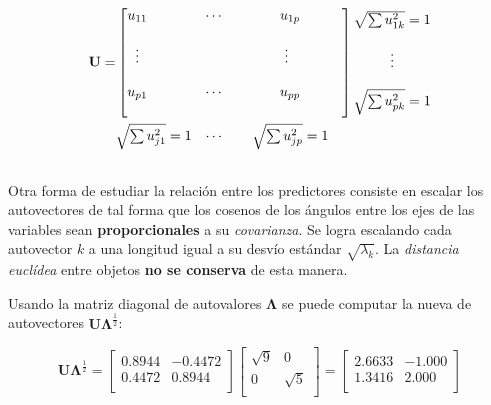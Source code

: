 \documentclass[]{book}
\theoremstyle{definition}
\theoremstyle{definition}
\theoremstyle{definition}
\theoremstyle{remark}
\begin{document}
\[
\begin{aligned}
  \mathbf{U} = 
    &\begin{bmatrix}
      u_{11}\hphantom{0000} & \hphantom{00}\cdots & \hphantom{000000}u_{1p}\hphantom{000000} \\\\
      \vdots\hphantom{0000} & \  & \hphantom{00000}\vdots\hphantom{000000} \\\\
      u_{p1}\hphantom{0000} & \hphantom{00}\cdots & \hphantom{000000}u_{pp}\hphantom{000000} \\
    &\end{bmatrix}
    \begin{matrix}
      \sqrt{\sum u_{1k}^{2}} = 1 \\\\
      \vdots \\\\
      \sqrt{\sum u_{pk}^{2}} = 1 \\
    \end{matrix} \\
    &\begin{matrix}
      \sqrt{\sum u_{j1}^{2}} = 1 & \cdots&& \sqrt{\sum u_{jp}^{2}} = 1 & \\
    &\end{matrix} \\
\end{aligned}
\]

Otra forma de estudiar la relación entre los predictores consiste en
escalar los autovectores de tal forma que los cosenos de los ángulos
entre los ejes de las variables sean \textbf{proporcionales} a su
\emph{covarianza}. Se logra escalando cada autovector \(k\) a una
longitud igual a su desvío estándar \(\sqrt{\lambda_{k}}\). La
\emph{distancia euclídea} entre objetos \textbf{no se conserva} de esta
manera.

Usando la matriz diagonal de autovalores \(\mathbf{\Lambda}\) se puede
computar la nueva de autovectores
\(\mathbf{U}\mathbf{\Lambda}^{\frac{1}{2}}\):

\[
\mathbf{U}\mathbf{\Lambda}^{\frac{1}{2}}\mathbf{=}\begin{bmatrix}
0.8944 & - 0.4472 \\
0.4472 & 0.8944 \\
\end{bmatrix}\begin{bmatrix}
\sqrt{9} & 0 \\
0 & \sqrt{5} \\
\end{bmatrix} = \begin{bmatrix}
2.6633 & - 1.000 \\
1.3416 & 2.000 \\
\end{bmatrix}
\]
\end{document}
